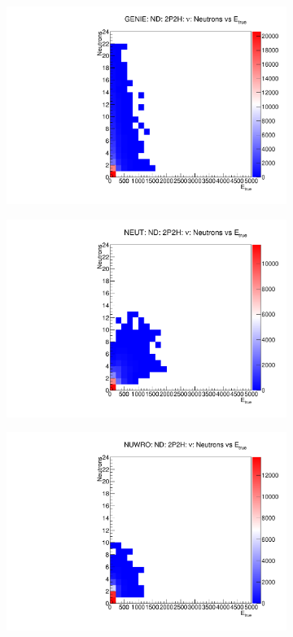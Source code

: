 \documentclass[12pt]{article}
\begin{document}
\begin{figure}
\centering
\begin{subfigure}[b]{0.32\textwidth}
  \includegraphics[width=\textwidth]{nneutrons_v_total_ene/Nneutrons_Total_ENe_2p2h_GENIE_ND_numu.pdf}
\end{subfigure}
\begin{subfigure}[b]{0.32\textwidth}
  \includegraphics[width=\textwidth]{nneutrons_v_total_ene/Nneutrons_Total_ENe_2p2h_NEUT_ND_numu.pdf}
\end{subfigure}
\begin{subfigure}[b]{0.32\textwidth}
  \includegraphics[width=\textwidth]{nneutrons_v_total_ene/Nneutrons_Total_ENe_2p2h_NUWRO_ND_numu.pdf}

\end{subfigure}
\end{figure}
\end{document}
